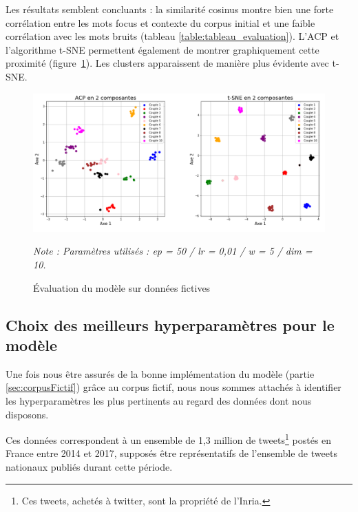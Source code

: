 \documentclass[11pt,french,french]{article}
\let\rmarkdownfootnote\footnote%
\def\footnote{\protect\rmarkdownfootnote}
\begin{document}
Les résultats semblent concluants : la similarité cosinus montre bien
une forte corrélation entre les mots focus et contexte du corpus initial
et une faible corrélation avec les mots bruits (tableau
\ref{table:tableau_evaluation}). L'ACP et l'algorithme t-SNE permettent
également de montrer graphiquement cette proximité
(figure~\ref{fig:figure_evaluation}). Les clusters apparaissent de
manière plus évidente avec t-SNE.

\begin{figure}
\begin{center}
\includegraphics[width=1\textwidth]{img/figures.png}
\captionsetup{margin=0cm,format=hang,justification=justified}
\caption{Évaluation du modèle sur données fictives}\label{fig:figure_evaluation}
\end{center}
\vspace{-0.3cm}
\footnotesize
\emph{Note : Paramètres utilisés : ep = 50 / lr = 0,01 / w = 5 / dim = 10.}
\end{figure}

\subsection{Choix des meilleurs hyperparamètres pour le
modèle}\label{choix-des-meilleurs-hyperparamuxe8tres-pour-le-moduxe8le}

Une fois nous être assurés de la bonne implémentation du modèle (partie
\ref{sec:corpusFictif}) grâce au corpus fictif, nous nous sommes
attachés à identifier les hyperparamètres les plus pertinents au regard
des données dont nous disposons.

Ces données correspondent à un ensemble de 1,3 million de
tweets\footnote{Ces tweets, achetés à twitter, sont la propriété de
  l'Inria.} postés en France entre 2014 et 2017, supposés être
représentatifs de l'ensemble de tweets nationaux publiés durant cette
période.
\end{document}
